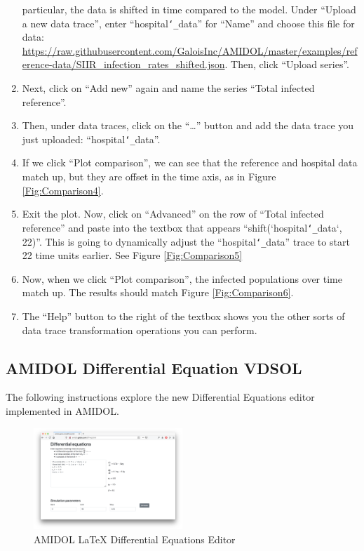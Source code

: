\documentclass[12pt]{galois-whitepaper}
\renewcommand{\textunderscore}{\texttt{\char`_}}
\begin{document}
\begin{enumerate}
  particular, the data is shifted in time compared to the model. Under
  “Upload a new data trace”, enter “hospital\textunderscore{}data” for “Name” and
  choose this file for data:
  \url{https://raw.githubusercontent.com/GaloisInc/AMIDOL/master/examples/reference-data/SIIR_infection_rates_shifted.json}. Then,
  click “Upload series”.
\item Next, click on “Add new” again and name the series “Total
  infected reference”.
\item Then, under data traces,  click on the “…” button and add the
  data trace you just uploaded: “hospital\textunderscore{}data”.
\item If we click “Plot comparison”, we can see that the reference and
  hospital data match up, but they are offset in the time axis, as in
  Figure \ref{Fig:Comparison4}.
\item Exit the plot. Now, click on “Advanced” on the row of “Total
  infected reference” and paste into the textbox that appears
  “shift(`hospital\textunderscore{}data`, 22)”. This is going to dynamically adjust
  the “hospital\textunderscore{}data” trace to start 22 time units earlier.  See
  Figure \ref{Fig:Comparison5}
\item Now, when we click “Plot comparison”, the infected populations
  over time match up.  The results should match Figure \ref{Fig:Comparison6}.
\item The “Help” button to the right of the textbox shows you the other sorts of data trace transformation operations you can perform.
\end{enumerate}

\subsection{AMIDOL Differential Equation VDSOL}

The following instructions explore the new Differential Equations
editor implemented in AMIDOL.

\begin{figure}
  \centering
  \includegraphics[width=0.5\textwidth]{figs/diff-eq-1.png}
  \caption{AMIDOL LaTeX Differential Equations Editor}
  \label{Fig:DiffEq1}
\end{figure}
\end{document}
